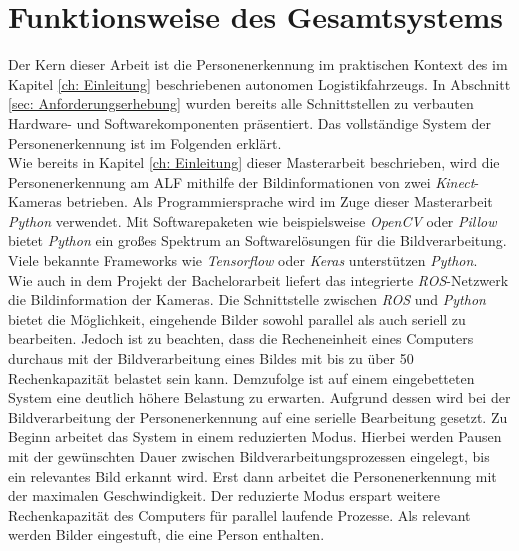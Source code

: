 	
	 
	
	\section{Funktionsweise des Gesamtsystems}
	\label{sec: Funktionsweise des Gesamtsystems}
		
	Der Kern dieser Arbeit ist die Personenerkennung im praktischen Kontext des im Kapitel \ref{ch: Einleitung} beschriebenen autonomen Logistikfahrzeugs. In Abschnitt \ref{sec: Anforderungserhebung} wurden bereits alle Schnittstellen zu verbauten Hardware- und Softwarekomponenten präsentiert. Das vollständige System der Personenerkennung ist im Folgenden erklärt.\\
	
	Wie bereits in Kapitel \ref{ch: Einleitung} dieser Masterarbeit beschrieben, wird die Personenerkennung am ALF mithilfe der Bildinformationen von zwei \textit{Kinect}-Kameras betrieben. Als Programmiersprache wird im Zuge dieser Masterarbeit \textit{Python} verwendet. Mit Softwarepaketen wie beispielsweise \textit{OpenCV} oder \textit{Pillow} bietet \textit{Python} ein großes Spektrum an Softwarelösungen für die Bildverarbeitung. Viele bekannte Frameworks wie \textit{Tensorflow} oder \textit{Keras} unterstützen \textit{Python}.\\
	
	Wie auch in dem Projekt der Bachelorarbeit liefert das integrierte \textit{ROS}-Netzwerk die Bildinformation der Kameras. Die Schnittstelle zwischen \textit{ROS} und \textit{Python} bietet die Möglichkeit, eingehende Bilder sowohl parallel als auch seriell zu bearbeiten. Jedoch ist zu beachten, dass die Recheneinheit eines Computers durchaus mit der Bildverarbeitung eines Bildes mit bis zu über 50 \percent\text{ } Rechenkapazität belastet sein kann. Demzufolge ist auf einem eingebetteten System eine deutlich höhere Belastung zu erwarten. Aufgrund dessen wird bei der Bildverarbeitung der Personenerkennung auf eine serielle Bearbeitung gesetzt. Zu Beginn arbeitet das System in einem reduzierten Modus. Hierbei werden Pausen mit der gewünschten Dauer zwischen Bildverarbeitungsprozessen eingelegt, bis ein relevantes Bild erkannt wird. Erst dann arbeitet die Personenerkennung mit der maximalen Geschwindigkeit. Der reduzierte Modus erspart weitere Rechenkapazität des Computers für parallel laufende Prozesse. Als relevant werden Bilder eingestuft, die eine Person enthalten.\\
	

